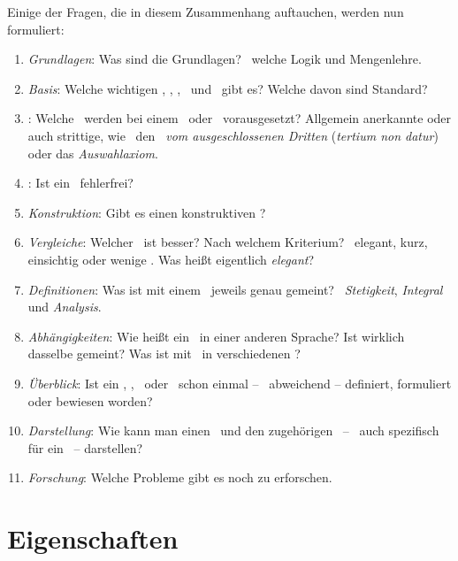 Einige der Fragen, die in diesem Zusammenhang auftauchen,
werden nun formuliert:
\begin{enumerate}
	\item \label{Frage-Grundlagen} \emph{Grundlagen}:
	Was sind die Grundlagen?
	\textZB\ welche Logik und Mengenlehre.
	\item \label{Frage-Basis} \emph{Basis}:
	Welche wichtigen \Axiome, \Saetze, \Beweise, \Fachbegriffe\ und \Fachgebiete\ gibt es?
	Welche davon sind Standard?
	\item \label{Frage-Axiome} \emph{\Axiome}:
	Welche \Axiome\ werden bei einem \Satz\ oder \Beweis\ vorausgesetzt?
	Allgemein anerkannte oder auch strittige, wie \textzB\ den \emph{\Satz\ vom ausgeschlossenen Dritten} (\emph{tertium non datur}) oder das \emph{Auswahlaxiom}.
	\item \label{Frage-Beweis} \emph{\Beweis}:
	Ist ein \Beweis\ fehlerfrei?
	\item \label{Frage-Konstruktion} \emph{Konstruktion}:
	Gibt es einen konstruktiven \Beweis?
	\item \label{Frage-Vergleiche} \emph{Vergleiche}:
	Welcher \Beweis\ ist besser?
	Nach welchem Kriterium?
	\textZB\ elegant, kurz, einsichtig oder wenige \Axiome.
	Was heißt eigentlich \emph{elegant}?
	\item \label{Frage-Definitionen} \emph{Definitionen}:
	Was ist mit einem \Fachbegriff\ jeweils genau gemeint?
	\textZB\ \emph{Stetigkeit}, \emph{Integral} und \emph{Analysis}.
	\item \label{Frage-Abhaengigkeiten} \emph{Abhängigkeiten}:
	Wie heißt ein \Fachbegriff\ in einer anderen Sprache?
	Ist wirklich dasselbe gemeint?
	Was ist mit \Fachbegriffen\ in verschiedenen \Fachgebieten?
	\item \label{Frage-Ueberblick} \emph{Überblick}:
	Ist ein \Axiom, \Satz, \Beweis\ oder \Fachbegriff\ schon einmal -- \textggf\ abweichend -- definiert, formuliert oder bewiesen worden?
	\item \label{Frage-Darstellung} \emph{Darstellung}:
	Wie kann man einen \Satz\ und den zugehörigen \Beweis\ -- \textggf\ auch spezifisch für ein \Fachgebiet\ -- darstellen?
	\item \label{Frage-Forschung} \emph{Forschung}:
	Welche Probleme gibt es noch zu erforschen.
\end{enumerate}

\section{Eigenschaften}%
\label{sec-Eigenschaften}

